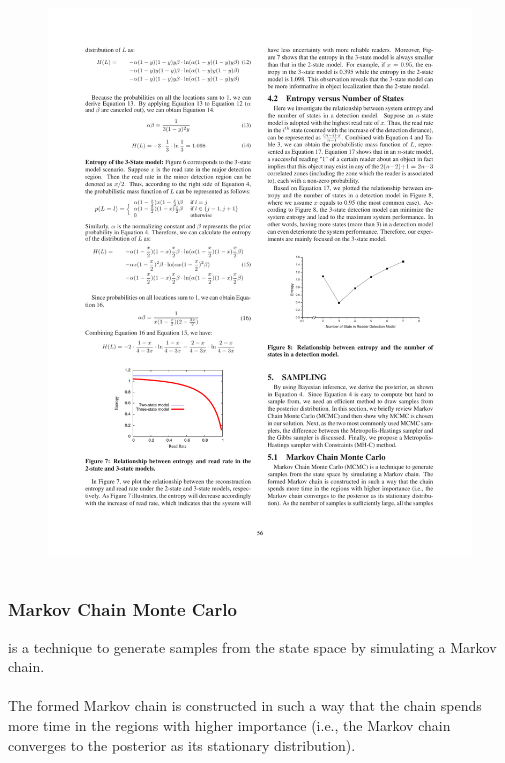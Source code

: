 \begin{frame}
\begin{columns}[c]
\begin{figure}[tb]
  \includegraphics[width=\columnwidth]{figures/3-1/3-1-9.pdf}
  \caption{}
\end{figure}

\end{columns}

\end{frame}


\begin{frame}
\frametitle{Markov Chain Monte Carlo}

\cite{andrieu2003introduction} is a technique to generate samples from the state space by simulating a Markov chain.\\~\\

The formed Markov chain is constructed in such a way that the chain spends more time in the regions with higher importance (i.e., the Markov chain converges to the posterior as its stationary distribution).

\end{frame}


